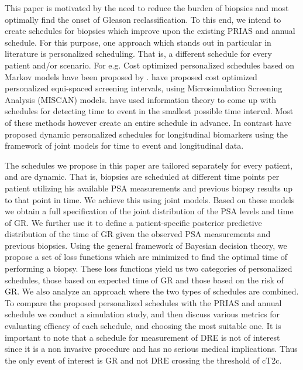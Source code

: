This paper is motivated by the need to reduce the burden of biopsies and most optimally find the onset of Gleason reclassification. To this end, we intend to create schedules for biopsies which improve upon the existing PRIAS and annual schedule. For this purpose, one approach which stands out in particular in literature is personalized scheduling. That is, a different schedule for every patient and/or scenario. For e.g. Cost optimized personalized schedules based on Markov models have been proposed by \cite{bebu2017OptimalScreening}. \cite{oMahonyOptimaInterval} have proposed cost optimized personalized equi-spaced screening intervals, using Microsimulation Screening Analysis (MISCAN) models. \cite{parmigiani1998designing} have used information theory to come up with schedules for detecting time to event in the smallest possible time interval. Most of these methods however create an entire schedule in advance. In contrast \cite{drizopoulosPersScreening} have proposed dynamic personalized schedules for longitudinal biomarkers using the framework of joint models for time to event and longitudinal data\citep{tsiatis2004joint,rizopoulos2012joint}.

The schedules we propose in this paper are tailored separately for every patient, and are dynamic. That is, biopsies are scheduled at different time points per patient utilizing his available PSA measurements and previous biopsy results up to that point in time. We achieve this using joint models. Based on these models we obtain a full specification of the joint distribution of the PSA levels and time of GR. We further use it to define a patient-specific posterior predictive distribution of the time of GR given the observed PSA measurements and previous biopsies. Using the general framework of Bayesian decision theory, we propose a set of loss functions which are minimized to find the optimal time of performing a biopsy. These loss functions yield us two categories of personalized schedules, those based on expected time of GR and those based on the risk of GR. We also analyze an approach where the two types of schedules are combined. To compare the proposed personalized schedules with the PRIAS and annual schedule we conduct a simulation study, and then discuss various metrics for evaluating efficacy of each schedule, and choosing the most suitable one. It is important to note that a schedule for measurement of DRE is not of interest since it is a non invasive procedure and has no serious medical implications. Thus the only event of interest is GR and not DRE crossing the threshold of cT2c.

